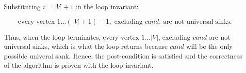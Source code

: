 \documentclass[a4paper]{report}
\begin{document}
\begin{enumerate}
      Substituting $i = |V| + 1$ in the loop invariant:

      $$ \text{every vertex }1\dots (|V|+1) - 1, \text{ excluding $cand$, are not universal sinks. }$$

      Thus, when the loop terminates, every vertex $ 1 \dots |V|$, excluding $cand$ are not universal sinks, which is what
      the loop returns because $cand$ will be the only possible univeral sank.
      Hence, the post-condition is satisfied and the correctness of the algorithm is proven with the loop invariant.
        



      


      
      

  \end{enumerate}

  
















































  
\end{document}

